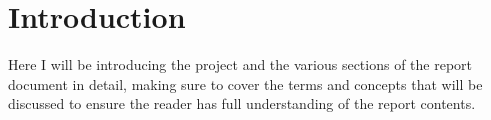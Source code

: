 \chapter{Introduction}
\label{intro}

Here I will be introducing the project and the various sections of the report document in detail, making sure to cover the terms and concepts that will be discussed to ensure the reader has full understanding of the report contents.